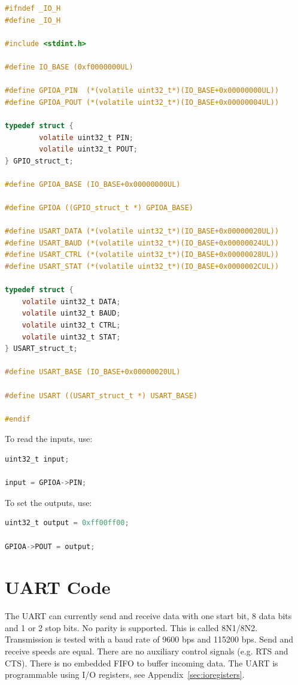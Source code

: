 \documentclass[12pt]{article}
\begin{document}
\begin{lstlisting}[language=C]
#ifndef _IO_H
#define _IO_H

#include <stdint.h>

#define IO_BASE (0xf0000000UL)

#define GPIOA_PIN  (*(volatile uint32_t*)(IO_BASE+0x00000000UL))
#define GPIOA_POUT (*(volatile uint32_t*)(IO_BASE+0x00000004UL))

typedef struct {
        volatile uint32_t PIN;
        volatile uint32_t POUT;
} GPIO_struct_t;

#define GPIOA_BASE (IO_BASE+0x00000000UL)

#define GPIOA ((GPIO_struct_t *) GPIOA_BASE)

#define USART_DATA (*(volatile uint32_t*)(IO_BASE+0x00000020UL))
#define USART_BAUD (*(volatile uint32_t*)(IO_BASE+0x00000024UL))
#define USART_CTRL (*(volatile uint32_t*)(IO_BASE+0x00000028UL))
#define USART_STAT (*(volatile uint32_t*)(IO_BASE+0x0000002CUL))

typedef struct {
	volatile uint32_t DATA;
	volatile uint32_t BAUD;
	volatile uint32_t CTRL;
	volatile uint32_t STAT;
} USART_struct_t;

#define USART_BASE (IO_BASE+0x00000020UL)

#define USART ((USART_struct_t *) USART_BASE)

#endif
\end{lstlisting}

To read the inputs, use:

\begin{lstlisting}[language=C]
uint32_t input;

input = GPIOA->PIN;
\end{lstlisting}

To set the outputs, use:

\begin{lstlisting}[language=C]
uint32_t output = 0xff00ff00;

GPIOA->POUT = output;
\end{lstlisting}

\section{UART Code}

The UART can currently send and receive data with one start bit, 8 data bits and 1 or 2 stop bits. No parity is supported. This is called 8N1/8N2. Transmission is tested with a baud rate of 9600 bps and 115200 bps. Send and receive speeds are equal. There are no auxiliary control signals (e.g. RTS and CTS). There is no embedded FIFO to buffer incoming data. The UART is programmable using I/O registers, see Appendix~\ref{sec:ioregisters}.
\end{document}
